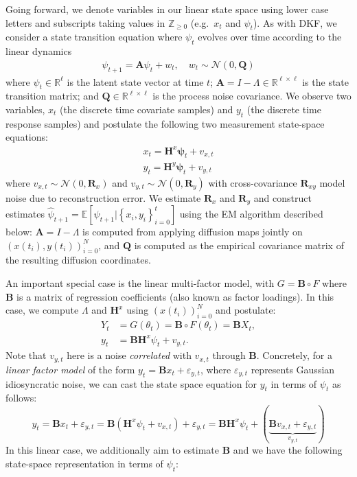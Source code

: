 \documentclass[11pt]{article}
\theoremstyle{plain}
\theoremstyle{definition}
\theoremstyle{remark}
\numberwithin{equation}{section}
\newcommand{\Z}{\mathbb{Z}}
\newcommand{\veps}{\varepsilon}
\begin{document}
Going forward, we denote variables in our linear state space using lower case letters and subscripts taking values in $\Z_{\ge0}$ (e.g.~$x_t$ and $\psi_t$). As with DKF, we consider a state transition equation where $\psi_t$ evolves over time according to the linear dynamics
\begin{align}\label{eq:psistep}
\psi_{t+1} = \mathbf{A} \psi_t + w_t, \quad w_t \sim \mathcal{N}(0, \mathbf{Q})
\end{align}
where $\psi_t \in \mathbb{R}^{\ell}$ is the latent state vector at time $t$; $\mathbf{A}=I-\Lambda \in \mathbb{R}^{\ell \times \ell}$ is the state transition matrix; and $\mathbf{Q} \in \mathbb{R}^{\ell \times \ell}$ is the process noise covariance.
We observe two variables, $x_t$ (the discrete time covariate samples) and $y_t$ (the discrete time response samples) and postulate the following two measurement state-space equations:
\begin{equation}\label{eq:xystep}
\begin{split}
 x_t = \mathbf{H}^x \mathbf{\psi}_t +{v}_{x,t}\\
 y_t = \mathbf{H}^y \mathbf{\psi}_t +{v}_{y,t}
\end{split}
\end{equation}
where $v_{x,t}\sim \mathcal{N}(0, {\mathbf{R}_x})$ and $v_{y,t}\sim \mathcal{N}(0, {\mathbf R}_y)$ with cross-covariance ${\mathbf R}_{xy}$ model noise due to reconstruction error.
We estimate $\mathbf{R}_x$ and $\mathbf{R}_y$ and construct estimates $\hat{\psi}_{t+1} = \mathbb{E} [\psi_{t+1} | \left\{x_i,y_i \right\}_{i=0}^{t}]$ using the EM algorithm described below: $\mathbf{A}=I-\Lambda$ is computed from applying diffusion maps jointly on $(x(t_i),y(t_i))_{i=0}^N$, and $\mathbf{Q}$ is computed as the empirical covariance matrix of the resulting diffusion coordinates. 

An important special case is the linear multi-factor model, with $G=\mathbf{B} \circ F$ where $\mathbf{B}$ is a matrix of regression coefficients (also known as factor loadings). In this case, we compute $\Lambda$ and $\mathbf{H}^x$ using $(x(t_i))_{i=0}^N$ and postulate:
\begin{align*}
Y_t&=G(\theta_t)=\mathbf{B} \circ F(\theta_t)=\mathbf{B}X_t,\\
y_t&=\mathbf{B}\mathbf{H}^x \psi_t+v_{y,t}.
\end{align*}
Note that $v_{y,t}$ here is a noise \textit{correlated} with $v_{x,t}$ through $\mathbf{B}$. Concretely, for a \textit{linear factor model} of the form $y_t=\mathbf{B}x_t+\veps_{y,t}$, where $\veps_{y,t}$ represents Gaussian idiosyncratic noise, we can cast the state space equation for $y_t$ in terms of $\psi_t$ as follows:
\[y_t=\mathbf{B}x_t+\veps_{y,t}
=\mathbf{B}(\mathbf{H}^x\psi_t+v_{x,t})+\veps_{y,t}
={\mathbf B} {\mathbf H}^x \psi_t + (\underbrace{\mathbf{B}v_{x,t}+\veps_{y,t}}_{v_{y,t}})\]
In this linear case, we additionally aim to estimate $\mathbf{B}$ and we have the following state-space representation in terms of $\psi_t$:
\end{document}
